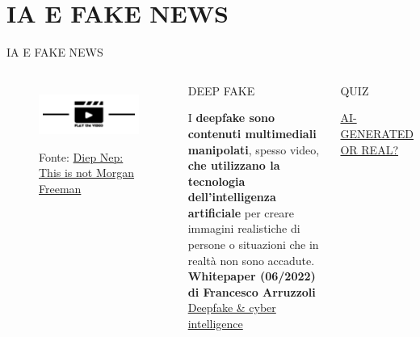\documentclass[aspectratio=1610]{beamer}
\begin{document}
\section{IA E FAKE NEWS}

\begin{frame}{IA E FAKE NEWS}
    \begin{columns}        
            \begin{figure}
                \href{https://www.youtube.com/watch?v=oxXpB9pSETo}{\includegraphics[width=\linewidth]{img/play.png}}
                \caption{{Fonte: \href{https://www.youtube.com/watch?v=oxXpB9pSETo}{Diep Nep: This is not Morgan Freeman}}}
            \end{figure}
            \begin{alertblock}{DEEP FAKE}
                \begin{minipage}{0.98\linewidth}
                    \justifying
                    I \textbf{deepfake sono contenuti multimediali manipolati}, spesso video, \textbf{che utilizzano la tecnologia 
                    dell’intelligenza artificiale} per creare immagini realistiche di persone o situazioni che 
                    in realtà non sono accadute.\\
                    \bigskip
                    \tiny{\textbf{Whitepaper (06/2022) di Francesco Arruzzoli}}\\
                    \tiny{\href{https://www.ictsecuritymagazine.com/pubblicazioni/deepfake-cyber-intelligence/}{Deepfake \& cyber intelligence}}
                \end{minipage}
            \end{alertblock}
            \pause
            \begin{alertblock}{QUIZ}
                \begin{minipage}{0.98\linewidth}
                    \tiny{\href{https://detectfakes.kellogg.northwestern.edu/}{AI-GENERATED OR REAL?}}
                \end{minipage}
            \end{alertblock}
    \end{columns}
\end{frame}
\end{document}
